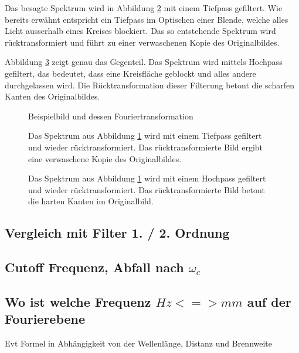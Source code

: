 Das besagte Spektrum wird in Abbildung \ref{opt:fig:image_lowpass} mit einem Tiefpass gefiltert.
Wie bereits erwähnt entspricht ein Tiefpass im Optischen einer Blende, welche alles Licht ausserhalb eines Kreises blockiert.
Das so entstehende Spektrum wird rücktransformiert und führt zu einer verwaschenen Kopie des Originalbildes.

Abbildung \ref{opt:fig:image_highpass} zeigt genau das Gegenteil. 
Das Spektrum wird mittels Hochpass gefiltert, das bedeutet, dass eine Kreisfläche geblockt und alles andere durchgelassen wird.
Die Rücktransformation dieser Filterung betont die scharfen Kanten des Originalbildes. 

\begin{figure}
    \centering

    \caption{Beispielbild und dessen Fouriertransformation}
    \label{opt:fig:image_raw}
\end{figure}

\begin{figure}
    \centering

    \caption{Das Spektrum aus Abbildung \ref{opt:fig:image_raw} wird mit einem Tiefpass gefiltert und wieder rücktransformiert.
    Das rücktransformierte Bild ergibt eine verwaschene Kopie des Originalbildes.}
    \label{opt:fig:image_lowpass}
\end{figure}

\begin{figure}
    \centering

    \caption{Das Spektrum aus Abbildung \ref{opt:fig:image_raw} wird mit einem Hochpass gefiltert und wieder rücktransformiert.
    Das rücktransformierte Bild betont die harten Kanten im Originalbild.}
    \label{opt:fig:image_highpass}
\end{figure}

\subsection{Vergleich mit Filter 1. / 2. Ordnung}

\subsection{Cutoff Frequenz, Abfall nach $\omega_c$}

\subsection{Wo ist welche Frequenz $Hz <=> mm$ auf der Fourierebene}
Evt Formel in Abhängigkeit von der Wellenlänge, Distanz und Brennweite

